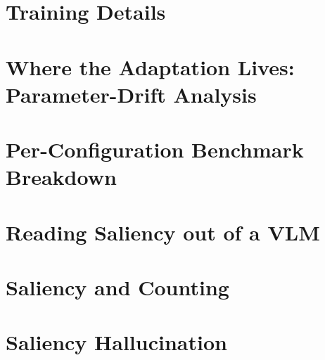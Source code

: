 \documentclass{article}
\theoremstyle{plain}
\theoremstyle{definition}
\theoremstyle{remark}
\begin{document}




\newpage
\appendix
\onecolumn


\section{Training Details}
\label{app:training}


\section{Where the Adaptation Lives: Parameter-Drift Analysis}
\label{app:drift}


\section{Per-Configuration Benchmark Breakdown}
\label{app:breakdown}


\section{Reading Saliency out of a VLM}
\label{app:attribution}


\section{Saliency and Counting}
\label{app:counting}


\section{Saliency Hallucination}
\label{app:hallucination}

\end{document}
